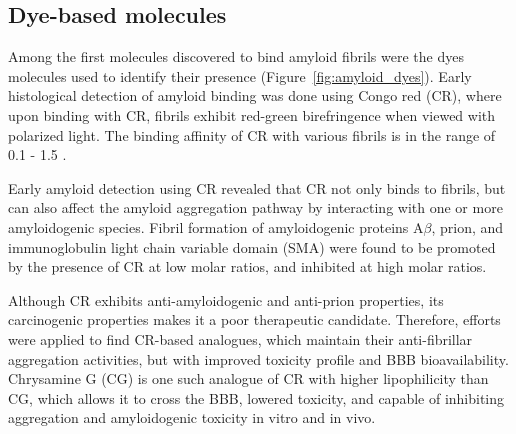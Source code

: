 
\subsection{Dye-based molecules}

Among the first molecules discovered to bind amyloid fibrils were the dyes molecules used to identify their presence (Figure~\ref{fig:amyloid_dyes}). Early histological detection of amyloid binding was done using Congo red (CR), where upon binding with CR, fibrils exhibit red-green birefringence when viewed with polarized light.\cite{Frid:2007bo} The binding affinity of CR with various fibrils is in the range of 0.1 - 1.5 \micromolar.\cite{Lendel:2009cg,Benditt:1970va,Klunk:1989vc}

Early amyloid detection using CR revealed that CR not only binds to fibrils, but can also affect the amyloid aggregation pathway by interacting with one or more amyloidogenic species.\cite{Caspi:1998vt}
Fibril formation of amyloidogenic proteins A$\beta$,\cite{Esler:1997bq} prion,\cite{Rudyk:2000ta} and immunoglobulin light chain variable domain (SMA)\cite{Kim:2003hv} were found to be promoted by the presence of CR at low molar ratios, and inhibited at high molar ratios. 

Although CR exhibits anti-amyloidogenic and anti-prion properties, its carcinogenic properties makes it a poor therapeutic candidate. Therefore, efforts were applied to find CR-based analogues, which maintain their anti-fibrillar aggregation activities, but with improved toxicity profile and BBB bioavailability. Chrysamine G (CG) is one such analogue of CR with higher lipophilicity than CG, which allows it to cross the BBB, lowered toxicity, and capable of inhibiting aggregation and amyloidogenic toxicity in vitro and in vivo.\cite{Klunk:1994um,Klunk:1998vm,Reinke:2007p155,Ishii:2002uf}

